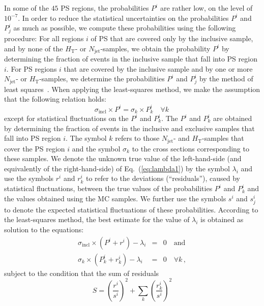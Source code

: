 \documentclass[twocolumn,epjc3]{svjour3}
\newcommand{\HT}{\ensuremath{H_{\mathrm{T}}}\xspace}
\newcommand{\incl}{\ensuremath{\textrm{incl}}\xspace}
\newcommand{\jet}{\ensuremath{\textrm{jet}}\xspace}
\begin{document}
In some of the $45$ PS regions, the probabilities $P^{i}$ are rather low, on the level of $10^{-7}$.
In order to reduce the statistical uncertainties on the probabilities $P^{i}$ and $P_{j}^{i}$ as much as possible,
we compute these probabilities using the following procedure:
For all regions $i$ of PS that are covered only by the inclusive sample, and by none of the $\HT$- or $N_{\jet}$-samples,
we obtain the probability $P^{i}$ by determining the fraction of events in the inclusive sample that fall into PS region $i$.
For PS regions $i$ that are covered by the inclusive sample and by one or more $N_{\jet}$- or $\HT$-samples,
we determine the probabilities $P^{i}$ and $P_{j}^{i}$ by the method of least squares~\cite{Cowan:1998ji}.
When applying the least-squares method, we make the assumption that the following relation holds:
\begin{equation}
\sigma_{\incl} \times P^{i} = \sigma_{k} \times P_{k}^{i} \quad \forall k \,
\label{eq:lambda1}
\end{equation}
except for statistical fluctuations on the $P^{i}$ and $P_{k}^{i}$.
The $P^{i}$ and $P_{k}^{i}$ are obtained by determining the fraction of events in the inclusive and exclusive samples that fall into PS region $i$.
The symbol $k$ refers to those $N_{\jet}$- and $\HT$-samples that cover the PS region $i$
and the symbol $\sigma_{k}$ to the cross sections corresponding to these samples.
We denote the unknown true value of the left-hand-side (and equivalently of the right-hand-side) of Eq.~(\ref{eq:lambda1}) by the symbol $\lambda_{i}$
and use the symbols $r^{i}$ and $r_{k}^{i}$ to refer to the deviations (``residuals''), caused by statistical fluctuations,
between the true values of the probabilities $P^{i}$ and $P_{k}^{i}$ and the values obtained using the MC samples.
We further use the symbols $s^{i}$ and $s_{j}^{i}$ to denote the expected statistical fluctuations of these probabilities.
According to the least-squares method,
the best estimate for the value of $\lambda_{i}$ is obtained as solution to the equations:
\begin{eqnarray*}
\sigma_{\incl} \times \left( P^{i} + r^{i} \right) - \lambda_{i} & = & 0 \quad \mbox{and} \\
\sigma_{k} \times \left( P_{k}^{i} + r_{k}^{i} \right) - \lambda_{i} & = & 0 \quad \forall k \, ,
\end{eqnarray*}
subject to the condition that the sum of residuals
\begin{equation*}
S = \left( \frac{r^{i}}{s^{i}} \right)^{2} + \sum_{k} \left( \frac{r_{k}^{i}}{s^{i}} \right)^{2}
\end{equation*}
\end{document}
